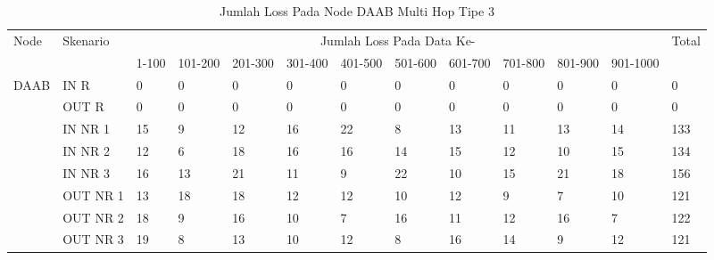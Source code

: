 \begin{table}[H]
  \centering
  \caption{Jumlah Loss Pada Node DAAB Multi Hop Tipe 3}
    \begin{tabular}{|p{1cm}|p{1.9cm}|p{0.6cm}|p{0.6cm}|p{0.6cm}|p{0.6cm}|p{0.6cm}|p{0.6cm}|p{0.6cm}|p{0.6cm}|p{0.6cm}|p{0.6cm}|p{1cm}|}
    \hline
        \multirow{2}{*}{Node}&\multirow{2}{*}{Skenario}&\multicolumn{10}{|c|}{Jumlah Loss Pada Data Ke-}&\multirow{2}{*}{Total} \\\cline{3-12}
          & & 1-100 & 101-200 & 201-300 & 301-400 & 401-500 & 501-600 & 601-700 & 701-800 & 801-900 & 901-1000 & \\
        \hline
    \multirow{8}{*}{DAAB}  
          & IN R  & 0     & 0     & 0     & 0     & 0     & 0     & 0     & 0     & 0     & 0     & 0 \\
          & OUT R & 0     & 0     & 0     & 0     & 0     & 0     & 0     & 0     & 0     & 0     & 0 \\
          & IN NR 1 & 15    & 9     & 12    & 16    & 22    & 8     & 13    & 11    & 13    & 14    & 133 \\
          & IN NR 2 & 12    & 6     & 18    & 16    & 16    & 14    & 15    & 12    & 10    & 15    & 134 \\
          & IN NR 3 & 16    & 13    & 21    & 11    & 9     & 22    & 10    & 15    & 21    & 18    & 156 \\
          & OUT NR 1 & 13    & 18    & 18    & 12    & 12    & 10    & 12    & 9     & 7     & 10    & 121 \\
          & OUT NR 2 & 18    & 9     & 16    & 10    & 7     & 16    & 11    & 12    & 16    & 7     & 122 \\
          & OUT NR 3 & 19    & 8     & 13    & 10    & 12    & 8     & 16    & 14    & 9     & 12    & 121 \\
    \hline
    \end{tabular}%
  \label{tab:addlabel}%
\end{table}%

